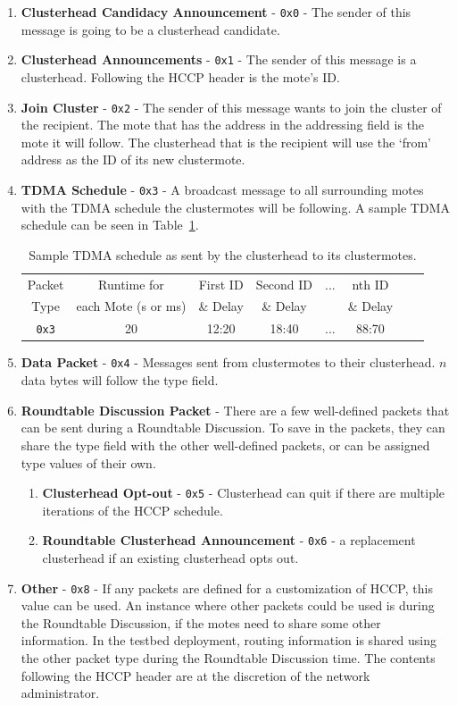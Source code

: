 \begin{enumerate}
	\item \textbf{Clusterhead Candidacy Announcement} - {\tt 0x0} - The sender of this message is going to be a clusterhead candidate.
	\item \textbf{Clusterhead Announcements} - {\tt 0x1} - The sender of this message is a clusterhead. Following the HCCP header is the mote's ID.
	\item \textbf{Join Cluster} - {\tt 0x2} - The sender of this message wants to join the cluster of the recipient. The mote that has the address in the addressing field is the mote 
	it will follow. The clusterhead that is the recipient will use the `from' address as the ID of its new clustermote.
	\item \textbf{TDMA Schedule} - {\tt 0x3} - A broadcast message to all surrounding motes with the TDMA schedule the 
	clustermotes will be following. A sample TDMA schedule
	can be seen in Table~\ref{tab:tdma}. \begin{table}[ht]
		\centering
		\begin{tabular}{|c|c|c|c|c|c|c|c|}
			\hline
			Packet  &  Runtime for  & First ID & Second ID &  ... & nth ID\\
			Type &  each Mote (s or ms) & \& Delay & \& Delay &  & \& Delay \\
			\hline
			{\tt 0x3} & 20 & 12:20 & 18:40 & ... & 88:70\\
			\hline
		\end{tabular}
		\caption{Sample TDMA schedule as sent by the clusterhead to its clustermotes.}
	\label{tab:tdma}
\end{table}
	
	\item \textbf{Data Packet} - {\tt 0x4} - Messages sent from clustermotes to their clusterhead. $n$ data bytes will follow the type field.
	\item \textbf{Roundtable Discussion Packet} - There are a few well-defined packets that can be sent during a Roundtable Discussion. To save in the packets, they 
	can share the type field with the other well-defined packets, or can be assigned type values of their own.
	\begin{enumerate}
		\item \textbf{Clusterhead Opt-out} - {\tt 0x5} - Clusterhead can quit if there are multiple iterations of the 
		HCCP schedule. 
		\item \textbf{Roundtable Clusterhead Announcement} - {\tt 0x6} - a replacement clusterhead if an existing clusterhead opts out.
	\end{enumerate}
	\item \textbf{Other} - {\tt 0x8} - If any packets are defined for a customization of HCCP, this value can be used. An instance where other packets could be used
	is during the Roundtable Discussion, if the motes need to share some other information. In the testbed deployment, routing information is shared using the
	other packet type during the Roundtable Discussion time. The contents following the HCCP header are at the discretion of the network administrator.
\end{enumerate}

